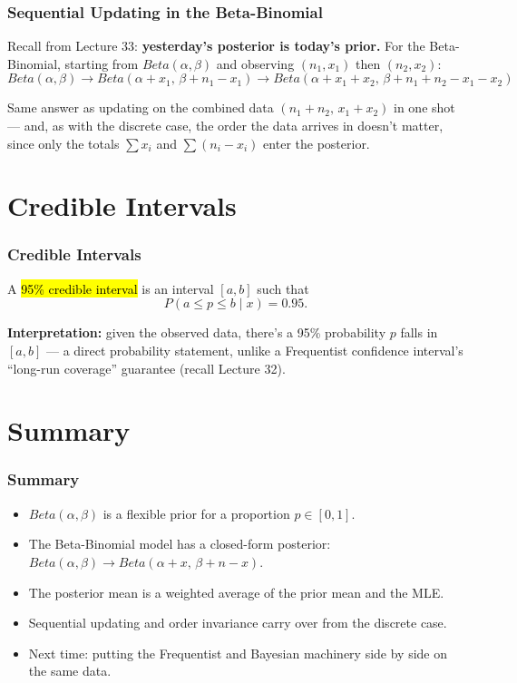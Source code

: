 \documentclass[slidestop,compress,mathserif]{beamer}
\begin{document}
\begin{frame}
    \frametitle{Sequential Updating in the Beta-Binomial}
    Recall from Lecture 33: \textbf{yesterday's posterior is today's prior.} For the Beta-Binomial, starting from $Beta(\alpha,\beta)$ and observing $(n_1,x_1)$ then $(n_2,x_2)$:
    \[
    Beta(\alpha,\beta) \to Beta(\alpha+x_1,\,\beta+n_1-x_1) \to Beta(\alpha+x_1+x_2,\,\beta+n_1+n_2-x_1-x_2)
    \]
    \pause

    \medskip
    Same answer as updating on the combined data $(n_1+n_2,\,x_1+x_2)$ in one shot --- and, as with the discrete case, the order the data arrives in doesn't matter, since only the totals $\sum x_i$ and $\sum(n_i-x_i)$ enter the posterior.
\end{frame}


\section{Credible Intervals}

\begin{frame}
    \frametitle{Credible Intervals}
    A \hl{95\% credible interval} is an interval $[a,b]$ such that
    \[
    P(a\le p\le b \mid x) = 0.95.
    \]
    \pause

    \medskip
    \textbf{Interpretation:} given the observed data, there's a 95\% probability $p$ falls in $[a,b]$ --- a direct probability statement, unlike a Frequentist confidence interval's ``long-run coverage'' guarantee (recall Lecture 32).
\end{frame}


\section{Summary}

\begin{frame}
    \frametitle{Summary}
    \begin{itemize}
        \item $Beta(\alpha,\beta)$ is a flexible prior for a proportion $p\in[0,1]$.
        \pause
        \item The Beta-Binomial model has a closed-form posterior: $Beta(\alpha,\beta) \to Beta(\alpha+x,\,\beta+n-x)$.
        \pause
        \item The posterior mean is a weighted average of the prior mean and the MLE.
        \pause
        \item Sequential updating and order invariance carry over from the discrete case.
        \pause
        \item Next time: putting the Frequentist and Bayesian machinery side by side on the same data.
    \end{itemize}
\end{frame}

\end{document}

